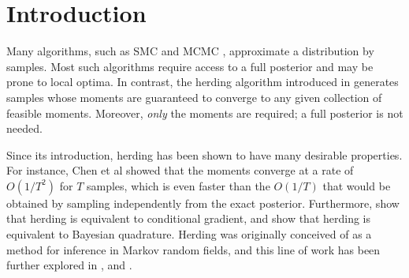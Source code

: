 \documentclass[paper.tex]{subfiles}
\begin{document}
\section{Introduction} 
\label{sec:intro}

Many algorithms, such as SMC \citep{smc} and MCMC \citep{mcmc}, approximate a 
distribution by samples. Most such algorithms require access to a full posterior and 
may be prone to local optima. In contrast, the herding algorithm introduced in 
\citet{Welling:2009a} generates samples whose moments are guaranteed to converge 
to any given collection of feasible moments. Moreover, \emph{only} the moments 
are required; a full posterior is not needed.

Since its introduction, herding has been shown to have many desirable properties.
For instance, Chen et al showed that the moments converge at a rate of $O(1/T^{2})$ for 
$T$ samples, which is even faster than the $O(1/T)$ that would be obtained 
by sampling independently from the exact posterior. Furthermore, \citet{Bach:2012a} show that herding is 
equivalent to conditional gradient, and \citet{Huszar:2012} show that 
herding is equivalent to Bayesian quadrature. Herding was originally conceived of as a method 
for inference in Markov random fields, and this line of work has been further explored in 
\citet{Welling:2009a}, \citet{Gelfand:2010} and \citet{Bornn:2013}.
\end{document}

